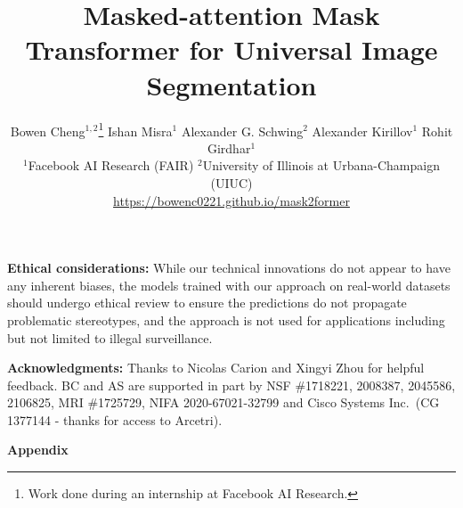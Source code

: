 \documentclass[10pt,twocolumn,letterpaper]{article}
\newcommand{\modelnamelong}{Masked-attention Mask Transformer\xspace}
\newcommand{\authorskip}{\hspace{2.5mm}}
\begin{document}
\title{\Large \modelnamelong for Universal Image Segmentation}




\author{
 Bowen Cheng$^{1,2}$\thanks{Work done during an internship at Facebook AI Research.} \authorskip Ishan Misra$^1$ \authorskip Alexander G. Schwing$^2$ \authorskip
 Alexander Kirillov$^1$ \authorskip Rohit Girdhar$^1$ \\
 $^1$Facebook AI Research (FAIR) \authorskip $^2$University of Illinois at Urbana-Champaign (UIUC) \\
{\small \url{https://bowenc0221.github.io/mask2former}}
}

\maketitle










{
\footnotesize
{\bf \noindent Ethical considerations:} 
While our technical innovations do not appear to have any inherent biases, the models trained with our approach on real-world datasets should undergo ethical review to ensure the predictions do not propagate problematic stereotypes, and the approach is not used for applications including but not limited to illegal surveillance.

\noindent\textbf{Acknowledgments:} Thanks to Nicolas Carion and Xingyi Zhou for helpful feedback. BC and AS are supported in part by NSF \#1718221, 2008387, 2045586, 2106825, MRI \#1725729, NIFA 2020-67021-32799 and Cisco Systems Inc.\ (CG 1377144 - thanks for access to Arcetri).
}

{\small


}


\clearpage
\appendix
\begin{center}{\bf \Large Appendix}\end{center}\vspace{-2mm}
\renewcommand{\thetable}{\Roman{table}}
\renewcommand{\thefigure}{\Roman{figure}}
\setcounter{table}{0}
\setcounter{figure}{0}

\end{document}
